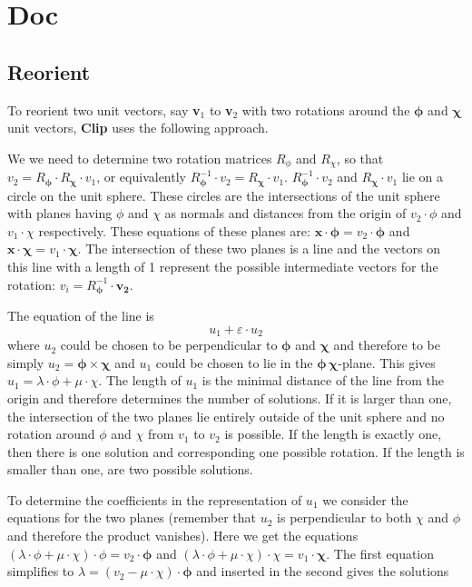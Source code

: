 \documentclass{article}
\newcommand{\clip}{ \textbf{Clip} }
\begin{document}
\section{Doc}
\subsection{Reorient}

To reorient two unit vectors, say \textbf{v$_1$} to \textbf{v$_2$} with two
rotations around the $\mathbf{\phi}$ and $\mathbf{\mathbf{\chi}}$ unit vectors,
\clip uses the following approach.

We we need to determine two rotation matrices $R_\phi$ and $R_\chi$, so that
$v_2 = R_\mathbf{\phi} \cdot R_\mathbf{\chi} \cdot v_1$, or equivalently
$R_\mathbf{\phi}^{-1} \cdot v_2 =  R_\mathbf{\chi} \cdot v_1$.
$R_\mathbf{\phi}^{-1} \cdot v_2$ and $R_\mathbf{\chi} \cdot v_1$ lie on a
circle on the unit sphere. These circles are the intersections of the unit
sphere with planes having $\phi$ and $\chi$ as normals and distances from the
origin of $v_2\cdot\phi$ and $v_1\cdot\chi$ respectively. These equations of
these planes are: $\mathbf{x}\cdot\mathbf{\phi}=v_2\cdot\mathbf{\phi}$ and
$\mathbf{x}\cdot\mathbf{\chi}=v_1\cdot\mathbf{\chi}$. The intersection of these
two planes is a line and the vectors on this line with a length of 1 represent
the possible intermediate vectors for the rotation: $v_i=R_\mathbf{\phi}^{-1}
\cdot \mathbf{v_2}$.

The equation of the line is
\begin{equation}
    u_1+\varepsilon\cdot u_2
    \label{lineEqn}
\end{equation}
where $u_2$ could be chosen to be perpendicular to $\mathbf{\phi}$ and
$\mathbf{\chi}$ and therefore to  be simply
$u_2=\mathbf{\phi}\times\mathbf{\chi}$ and $u_1$ could be chosen to lie in the
$\mathbf{\phi}\,\mathbf{\chi}$-plane. This gives $u_1=\lambda \cdot \phi + \mu
\cdot \chi$. The length of $u_1$ is the minimal distance of the line from the
origin and therefore determines the number of solutions. If it is larger than
one, the intersection of the two planes lie entirely outside of the unit sphere
and no rotation around $\phi$ and $\chi$ from $v_1$ to $v_2$ is possible. If
the length is exactly one, then there is one solution and corresponding one
possible rotation. If the length is smaller than one, are two possible
solutions.

To determine the coefficients in the representation of $u_1$ we consider the
equations for the two planes (remember that $u_2$ is perpendicular to both
$\chi$ and $\phi$ and therefore the product vanishes). Here we get the
equations  $(\lambda \cdot \phi + \mu \cdot \chi) \cdot \phi =
v_2\cdot\mathbf{\phi}$ and $(\lambda \cdot \phi + \mu \cdot \chi) \cdot \chi =
v_1\cdot\mathbf{\chi}$. The first equation simplifies to $\lambda  = (v_2-\mu
\cdot \chi) \cdot\mathbf{\phi}$ and inserted in the second gives the solutions
\end{document}

